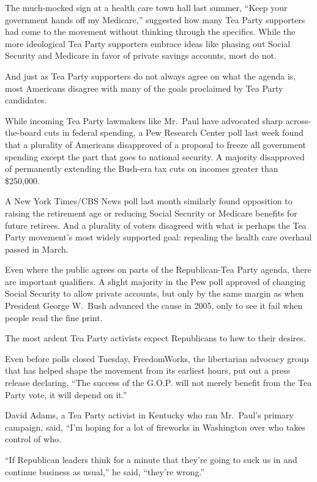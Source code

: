 ﻿\documentclass[12pt]{article}
\begin{document}
The much-mocked sign at a health care town hall last summer, ``Keep your government hands off my
Medicare,'' suggested how many Tea Party supporters had come to the movement without thinking
through the specifics. While the more ideological Tea Party supporters embrace ideas like phasing
out Social Security and Medicare in favor of private savings accounts, most do not.

And just as Tea Party supporters do not always agree on what the agenda is, most Americans disagree
with many of the goals proclaimed by Tea Party candidates.

While incoming Tea Party lawmakers like Mr.~Paul have advocated sharp across-the-board cuts in
federal spending, a Pew Research Center poll last week found that a plurality of Americans
disapproved of a proposal to freeze all government spending except the part that goes to national
security. A majority disapproved of permanently extending the Bush-era tax cuts on incomes greater
than \$250,000.

A New York Times/CBS News poll last month similarly found opposition to raising the retirement age
or reducing Social Security or Medicare benefits for future retirees. And a plurality of voters
disagreed with what is perhaps the Tea Party movement's most widely supported goal: repealing the
health care overhaul passed in March.

Even where the public agrees on parts of the Republican-Tea Party agenda, there are important
qualifiers. A slight majority in the Pew poll approved of changing Social Security to allow private
accounts, but only by the same margin as when President George W.~Bush advanced the cause in 2005,
only to see it fail when people read the fine print.

The most ardent Tea Party activists expect Republicans to hew to their desires.

Even before polls closed Tuesday, FreedomWorks, the libertarian advocacy group that has helped shape
the movement from its earliest hours, put out a press release declaring, ``The success of the G.O.P.
will not merely benefit from the Tea Party vote, it will depend on it.''

David Adams, a Tea Party activist in Kentucky who ran Mr.~Paul's primary campaign, said, ``I'm
hoping for a lot of fireworks in Washington over who takes control of who.

``If Republican leaders think for a minute that they're going to suck us in and continue business as
usual,'' he said, ``they're wrong.''
\end{document}
